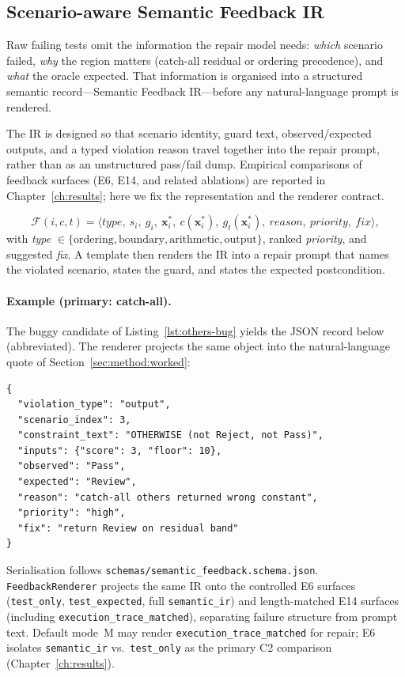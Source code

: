 \subsection{Scenario-aware Semantic Feedback IR}
\label{subsec:feedback-ir}

Raw failing tests omit the information the repair model needs:
\emph{which} scenario failed, \emph{why} the region matters (catch-all residual
or ordering precedence), and \emph{what} the oracle expected.
That information is organised into a structured semantic record---Semantic
Feedback IR---before any natural-language prompt is rendered.

The IR is designed so that scenario identity, guard text, observed/expected
outputs, and a typed violation reason travel together into the repair prompt,
rather than as an unstructured pass/fail dump.
Empirical comparisons of feedback surfaces (E6, E14, and related ablations)
are reported in Chapter~\ref{ch:results}; here we fix the representation and
the renderer contract.

\begin{equation}
  \mathcal{F}(i, c, t) = \langle \textit{type},\ s_i,\ g_i,\ \mathbf{x}_i^*,
  \ c(\mathbf{x}_i^*),\ g_t(\mathbf{x}_i^*),\ \textit{reason},\
  \textit{priority},\ \textit{fix} \rangle,
\end{equation}
with \textit{type} $\in \{\text{ordering}, \text{boundary}, \text{arithmetic},
\text{output}\}$, ranked \textit{priority}, and suggested \textit{fix}.
A template then renders the IR into a repair prompt that names the violated
scenario, states the guard, and states the expected postcondition.

\paragraph{Example (primary: catch-all).}
The buggy candidate of Listing~\ref{lst:others-bug} yields the JSON record
below (abbreviated).  The renderer projects the same object into the
natural-language quote of Section~\ref{sec:method:worked}:
\begin{lstlisting}[language={},basicstyle=\ttfamily\footnotesize,frame=single]
{
  "violation_type": "output",
  "scenario_index": 3,
  "constraint_text": "OTHERWISE (not Reject, not Pass)",
  "inputs": {"score": 3, "floor": 10},
  "observed": "Pass",
  "expected": "Review",
  "reason": "catch-all others returned wrong constant",
  "priority": "high",
  "fix": "return Review on residual band"
}
\end{lstlisting}
Serialisation follows \texttt{schemas/semantic\_feedback.schema.json}.
\texttt{FeedbackRenderer} projects the same IR onto the controlled E6 surfaces
(\texttt{test\_only}, \texttt{test\_expected}, full \texttt{semantic\_ir}) and
length-matched E14 surfaces (including \texttt{execution\_trace\_matched}),
separating failure structure from prompt text.
Default mode~M may render \texttt{execution\_trace\_matched} for repair;
E6 isolates \texttt{semantic\_ir} vs.\ \texttt{test\_only} as the primary C2
comparison (Chapter~\ref{ch:results}).

